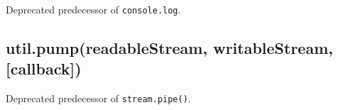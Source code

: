 Deprecated predecessor of \texttt{console.log}.

\subsection{util.pump(readableStream, writableStream,
{[}callback{]})}\label{util.pumpreadablestream-writablestream-callback}

\begin{Shaded}
\begin{Highlighting}[]
 
\end{Highlighting}
\end{Shaded}

Deprecated predecessor of \texttt{stream.pipe()}.
